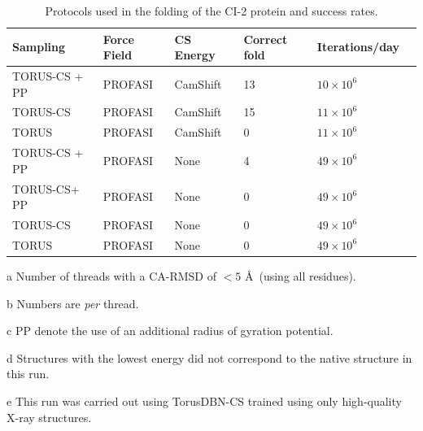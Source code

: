 \begin{table}[h]
    \caption{Protocols used in the folding of the CI-2 protein and success rates.}
    \begin{center}
    \begin{threeparttable}
    \begin{tabular}{l l l l l l}
        Sampling        & Force Field   & CS Energy         & Correct fold\tnote{a} & Iterations/day\tnote{b}\\\hline
          TORUS-CS + PP\tnote{c} & PROFASI       & CamShift          & 13            & $10 \times 10^6$ \\
          TORUS-CS      & PROFASI       & CamShift          & 15            & $11 \times 10^6$\\
          TORUS         & PROFASI       & CamShift          & 0             & $11 \times 10^6$\\
 TORUS-CS + PP\tnote{c} & PROFASI       & None              & 4\tnote{d}      & $49 \times 10^6$\\
 TORUS-CS\tnote{e}+ PP\tnote{c} & PROFASI      & None              & 0             & $49 \times 10^6$\\
          TORUS-CS      & PROFASI       & None              & 0             & $49 \times 10^6$\\
          TORUS         & PROFASI       & None              & 0             & $49 \times 10^6$\\
    \end{tabular}
    \begin{tablenotes}
        \item[a] Number of threads with a CA-RMSD of $<5$ \AA\ (using all residues).\\
        \item[b] Numbers are \textit{per} thread.
        \item[c] PP denote the use of an additional radius of gyration potential\cite{Phaistos_oldest}.\\
        \item[d] Structures with the lowest energy did not correspond to the native structure in this run.\\
        \item[e] This run was carried out using TorusDBN-CS trained using only high-quality X-ray structures.
    \end{tablenotes}
    \end{threeparttable}
    \end{center}
    \label{tab:ci2}
\end{table}
